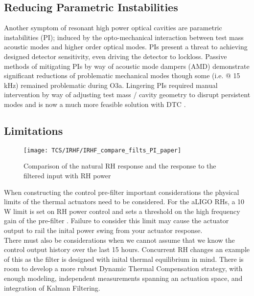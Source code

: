 \subsection{Reducing Parametric Instabilities}
Another symptom of resonant high power optical cavities are parametric instabilities (PI); induced by the opto-mechanical interaction between test mass acoustic modes and higher order optical modes. PIs present a threat to achieving designed detector sensitivity, even driving the detector to lockloss. Passive methods of mitigating PIs by way of acoustic mode dampers (AMD) demonstrate significant reductions of problematic mechanical modes though some (i.e. @ 15 kHz) remained problematic during O3a. Lingering PIs required manual intervention by way of adjusting test mass / cavity geometry to disrupt persistent modes and is now a much more feasible solution with DTC \cite{hardwick:2020}.  

\subsection{Limitations}
\begin{figure}[H]
    \centering
    \texttt{[image: TCS/IRHF/IRHF\_compare\_filts\_PI\_paper]}
    \caption{Comparison of the natural RH response and the response to the filtered input with RH power}
    \label{fig:RH_power}
\end{figure}
When constructing the control pre-filter important considerations the physical limits of the thermal actuators need to be considered. For the aLIGO RHs, a 10 W limit is set on RH power control and sets a threshold on the high frequency gain of the pre-filter \cite{dcc:rhspec}. Failure to consider this limit may cause the actuator output to rail the inital power swing from your actuator response.
\\ 
There must also be considerations when we cannot assume that we know the control output history over the last 15 hours. 
\iffalse \swb{Replace "the scaling of this function is not linear and time-invariant" with "that we know the control output history over the last 15 hours."} \fi Concurrent RH changes an example of this as the filter is designed with inital thermal equilibrium in mind. There is room to develop a more rubust Dynamic Thermal Compensation strategy, with enough modeling, independent measurements spanning an actuation space, and integration of Kalman Filtering.

